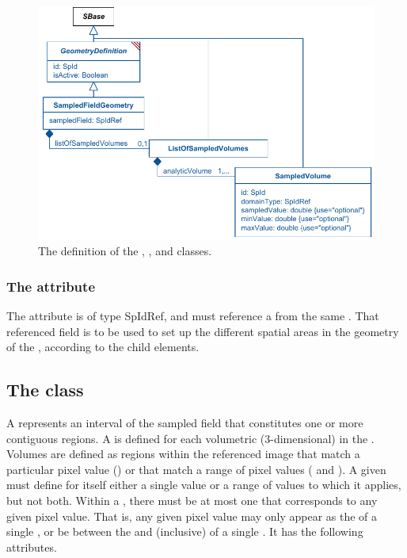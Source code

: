\begin{figure}[ht]
  \includegraphics{figs/SampledFieldGeometry-uml}
  \caption{The definition of the \SampledFieldGeometry, \ListOfSampledVolumes, and \SampledVolume classes.}
  \label{SampledFieldGeometry-uml}
  \label{ListOfSampledVolumes-uml}
  \label{SampledVolume-uml}
\end{figure}

\subsubsection{The \fixttspace{} attribute}
The  attribute is of type SpIdRef, and must reference a \SampledField from the same \Geometry.  That referenced field is to be used to set up the different spatial areas in the geometry of the \Model, according to the \SampledVolume child elements.

\subsection{The  class}
\label{sampledvolume-class}
A \SampledVolume represents an interval of the sampled field that constitutes one or more contiguous regions. A \SampledVolume is defined for each volumetric (3-dimensional) \Domain in the \Geometry. Volumes are defined as regions within the referenced image that match a particular pixel value () or that match a range of pixel values ( and ).  A given \SampledVolume must define for itself either a single value or a range of values to which it applies, but not both.  Within a \ListOfSampledVolumes, there must be at most one \SampledVolume that corresponds to any given pixel value.  That is, any given pixel value may only appear as the  of a single \SampledVolume, or be between the  and  (inclusive) of a single \SampledVolume.  It has the following attributes.

